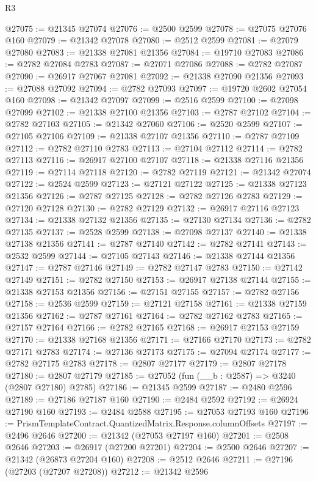 \begin{lexlean}{R3}
\begin{coremodule}
@27075 := @21345 @27074
@27076 := @2500 @2599
@27078 := @27075 @27076 @160
@27079 := @21342 @27078
@27080 := @2512 @2599
@27081 := @27079 @27080
@27083 := @21338 @27081 @21356
@27084 := @19710 @27083
@27086 := @2782 @27084 @2783
@27087 := @27071 @27086
@27088 := @2782 @27087
@27090 := @26917 @27067 @27081
@27092 := @21338 @27090 @21356
@27093 := @27088 @27092
@27094 := @2782 @27093
@27097 := @19720 @2602 @27054 @160
@27098 := @21342 @27097
@27099 := @2516 @2599
@27100 := @27098 @27099
@27102 := @21338 @27100 @21356
@27103 := @2787 @27102
@27104 := @2782 @27103
@27105 := @21342 @27060
@27106 := @2520 @2599
@27107 := @27105 @27106
@27109 := @21338 @27107 @21356
@27110 := @2787 @27109
@27112 := @2782 @27110 @2783
@27113 := @27104 @27112
@27114 := @2782 @27113
@27116 := @26917 @27100 @27107
@27118 := @21338 @27116 @21356
@27119 := @27114 @27118
@27120 := @2782 @27119
@27121 := @21342 @27074
@27122 := @2524 @2599
@27123 := @27121 @27122
@27125 := @21338 @27123 @21356
@27126 := @2787 @27125
@27128 := @2782 @27126 @2783
@27129 := @27120 @27128
@27130 := @2782 @27129
@27132 := @26917 @27116 @27123
@27134 := @21338 @27132 @21356
@27135 := @27130 @27134
@27136 := @2782 @27135
@27137 := @2528 @2599
@27138 := @27098 @27137
@27140 := @21338 @27138 @21356
@27141 := @2787 @27140
@27142 := @2782 @27141
@27143 := @2532 @2599
@27144 := @27105 @27143
@27146 := @21338 @27144 @21356
@27147 := @2787 @27146
@27149 := @2782 @27147 @2783
@27150 := @27142 @27149
@27151 := @2782 @27150
@27153 := @26917 @27138 @27144
@27155 := @21338 @27153 @21356
@27156 := @27151 @27155
@27157 := @2782 @27156
@27158 := @2536 @2599
@27159 := @27121 @27158
@27161 := @21338 @27159 @21356
@27162 := @2787 @27161
@27164 := @2782 @27162 @2783
@27165 := @27157 @27164
@27166 := @2782 @27165
@27168 := @26917 @27153 @27159
@27170 := @21338 @27168 @21356
@27171 := @27166 @27170
@27173 := @2782 @27171 @2783
@27174 := @27136 @27173
@27175 := @27094 @27174
@27177 := @2782 @27175 @2783
@27178 := @2807 @27177
@27179 := @2807 @27178
@27180 := @2807 @27179
@27185 := @27052 (fun (__b : @2587) => @3240 (@2807 @27180) @2785)
@27186 := @21345 @2599
@27187 := @2480 @2596
@27189 := @27186 @27187 @160
@27190 := @2484 @2592
@27192 := @26924 @27190 @160
@27193 := @2484 @2588
@27195 := @27053 @27193 @160
@27196 := PrismTemplateContract.QuantizedMatrix.Response.columnOffsets
@27197 := @2496 @2646
@27200 := @21342 (@27053 @27197 @160)
@27201 := @2508 @2646
@27203 := @26917 (@27200 @27201)
@27204 := @2500 @2646
@27207 := @21342 (@26873 @27204 @160)
@27208 := @2512 @2646
@27211 := @27196 (@27203 (@27207 @27208))
@27212 := @21342 @2596

\end{coremodule}
\end{lexlean}
